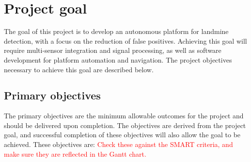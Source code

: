 \documentclass[main.tex]{subfiles}
\begin{document}
\section{Project goal}

The goal of this project is to develop an autonomous platform for landmine detection, with a focus on the reduction of false positives. Achieving this goal will require multi-sensor integration and signal processing, as well as software development for platform automation and navigation. The project objectives necessary to achieve this goal are described below.
 
\subsection{Primary objectives}
The primary objectives are the minimum allowable outcomes for the project and should be delivered upon completion. The objectives are derived from the project goal, and successful completion of these objectives will also allow the goal to be achieved. These objectives are: \textcolor{red}{Check these against the SMART criteria, and make sure they are reflected in the Gantt chart.}
\end{document}
